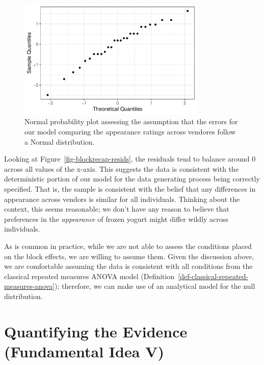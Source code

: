 \documentclass[
  letterpaper,
  DIV=11,
  numbers=noendperiod]{scrreprt}
\theoremstyle{definition}
\theoremstyle{definition}
\theoremstyle{plain}
\theoremstyle{remark}
\begin{document}
\begin{figure}

{\centering \includegraphics[width=0.8\textwidth,height=\textheight]{./images/fig-blockrecap-probplot-1.pdf}

}

\caption{\label{fig-blockrecap-probplot}Normal probability plot
assessing the assumption that the errors for our model comparing the
appearance ratings across vendores follow a Normal distribution.}

\end{figure}

Looking at Figure~\ref{fig-blockrecap-resids}, the residuals tend to
balance around 0 across all values of the x-axis. This suggests the data
is consistent with the deterministic portion of our model for the data
generating process being correctly specified. That is, the sample is
consistent with the belief that any differences in appearance across
vendors is similar for all individuals. Thinking about the context, this
seems reasonable; we don't have any reason to believe that preferences
in the \emph{appearance} of frozen yogurt might differ wildly across
individuals.

As is common in practice, while we are not able to assess the conditions
placed on the block effects, we are willing to assume them. Given the
discussion above, we are comfortable assuming the data is consistent
with all conditions from the classical repeated measures ANOVA model
(Definition~\ref{def-classical-repeated-measures-anova}); therefore, we
can make use of an analytical model for the null distribution.

\hypertarget{quantifying-the-evidence-fundamental-idea-v-2}{%
\section{Quantifying the Evidence (Fundamental Idea
V)}\label{quantifying-the-evidence-fundamental-idea-v-2}}
\end{document}
